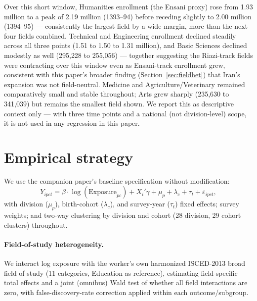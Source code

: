 \documentclass[11pt]{article}
\begin{document}
Over this short window, Humanities enrollment (the Ensani proxy) rose from 1.93 million to a peak of 2.19 million (1393--94) before receding slightly to 2.00 million (1394--95) --- consistently the largest field by a wide margin, more than the next four fields combined. Technical and Engineering enrollment declined steadily across all three points (1.51 to 1.50 to 1.31 million), and Basic Sciences declined modestly as well (295{,}228 to 255{,}056) --- together suggesting the Riazi-track fields were contracting over this window even as Ensani-track enrollment grew, consistent with this paper's broader finding (Section~\ref{sec:fieldhet}) that Iran's expansion was not field-neutral. Medicine and Agriculture/Veterinary remained comparatively small and stable throughout; Arts grew sharply (235{,}630 to 341{,}039) but remains the smallest field shown. We report this as descriptive context only --- with three time points and a national (not division-level) scope, it is not used in any regression in this paper.

\section{Empirical strategy}

We use the companion paper's baseline specification without modification:
\begin{equation}
Y_{ipct} = \beta \cdot \log(\text{Exposure}_{pc}) + X_i'\gamma + \mu_p + \lambda_c + \tau_t + \varepsilon_{ipct},
\end{equation}
with division ($\mu_p$), birth-cohort ($\lambda_c$), and survey-year ($\tau_t$) fixed effects; survey weights; and two-way clustering by division and cohort (28 division, 29 cohort clusters) throughout.

\paragraph{Field-of-study heterogeneity.} We interact log exposure with the worker's own harmonized ISCED-2013 broad field of study (11 categories, Education as reference), estimating field-specific total effects and a joint (omnibus) Wald test of whether all field interactions are zero, with false-discovery-rate correction applied within each outcome/subgroup.
\end{document}
